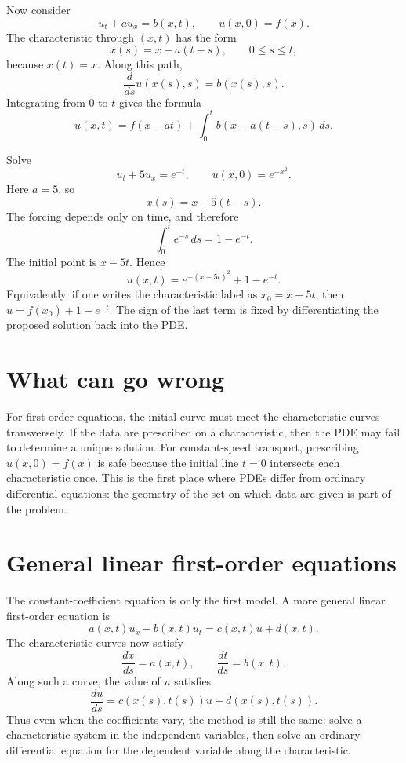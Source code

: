 Now consider
\[
  u_t+a u_x=b(x,t),\qquad u(x,0)=f(x).
\]
The characteristic through \((x,t)\) has the form
\[
  x(s)=x-a(t-s),\qquad 0\le s\le t,
\]
because \(x(t)=x\).  Along this path,
\[
  \frac{d}{ds}u(x(s),s)=b(x(s),s).
\]
Integrating from \(0\) to \(t\) gives the formula
\[
  u(x,t)=f(x-at)+\int_0^t b(x-a(t-s),s)\,ds.
\]

\begin{example}
Solve
\[
  u_t+5u_x=e^{-t},\qquad u(x,0)=e^{-x^2}.
\]
Here \(a=5\), so
\[
  x(s)=x-5(t-s).
\]
The forcing depends only on time, and therefore
\[
  \int_0^t e^{-s}\,ds=1-e^{-t}.
\]
The initial point is \(x-5t\).  Hence
\[
  u(x,t)=e^{-(x-5t)^2}+1-e^{-t}.
\]
Equivalently, if one writes the characteristic label as \(x_0=x-5t\), then \(u=f(x_0)+1-e^{-t}\).  The sign of the last term is fixed by differentiating the proposed solution back into the PDE.
\end{example}

\section{What can go wrong}

For first-order equations, the initial curve must meet the characteristic curves transversely.  If the data are prescribed on a characteristic, then the PDE may fail to determine a unique solution.  For constant-speed transport, prescribing \(u(x,0)=f(x)\) is safe because the initial line \(t=0\) intersects each characteristic once.  This is the first place where PDEs differ from ordinary differential equations: the geometry of the set on which data are given is part of the problem.

\section{General linear first-order equations}

The constant-coefficient equation is only the first model.  A more general linear first-order equation is
\[
  a(x,t)u_x+b(x,t)u_t=c(x,t)u+d(x,t).
\]
The characteristic curves now satisfy
\[
  \frac{dx}{ds}=a(x,t),\qquad \frac{dt}{ds}=b(x,t).
\]
Along such a curve, the value of \(u\) satisfies
\[
  \frac{du}{ds}=c(x(s),t(s))u+d(x(s),t(s)).
\]
Thus even when the coefficients vary, the method is still the same: solve a characteristic system in the independent variables, then solve an ordinary differential equation for the dependent variable along the characteristic.

